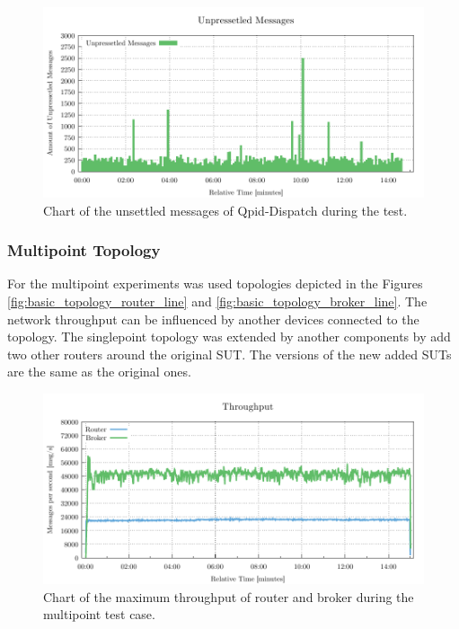 \begin{figure}[H]
	\centering
	\includegraphics[width=1\linewidth]{obrazky-figures/charts/singlepoint-router-throughput-routerLink.pdf}
	\caption{Chart of the unsettled messages of Qpid-Dispatch during the test.}
	\label{fig:router-single-routerLink}
\end{figure}


\subsubsection*{Multipoint Topology}
For the multipoint experiments was used topologies depicted in the Figures \ref{fig:basic_topology_router_line} and \ref{fig:basic_topology_broker_line}. The network throughput can be influenced by another devices connected to the topology. The singlepoint topology was extended by another components by add two other routers around the original SUT. The versions of the new added SUTs are the same as the original ones.

\begin{figure}[H]
	\centering
	\includegraphics[width=1\linewidth]{obrazky-figures/charts/multipoint-throughput.pdf}
	\caption{Chart of the maximum throughput of router and broker during the multipoint test case.}
	\label{fig:rate-multipoint-router}
\end{figure}

